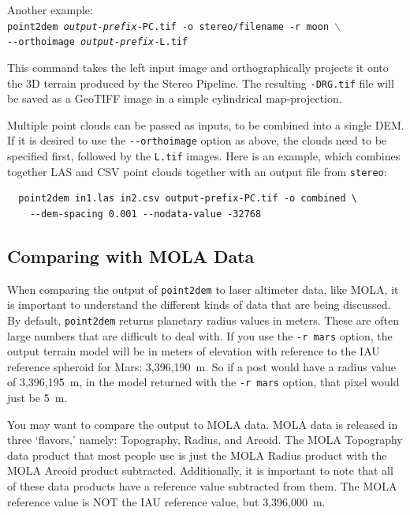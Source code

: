 Another example: \\
\hspace*{2em}\texttt{point2dem \textit{output-prefix}-PC.tif -o stereo/filename -r moon $\backslash$} \\
\hspace*{4em}\texttt{-\/-orthoimage \textit{output-prefix}-L.tif}

This command takes the left input image and orthographically projects
it onto the 3D terrain produced by the Stereo Pipeline.  The resulting
{\tt *-DRG.tif} file will be saved as a GeoTIFF image in a
simple cylindrical map-projection.

Multiple point clouds can be passed as inputs, to be combined into a
single \ac{DEM}. If it is desired to use the \texttt{-\/-orthoimage}
option as above, the clouds need to be specified first, followed by the
\texttt{L.tif} images. Here is an example, which combines together LAS
and CSV point clouds together with an output file from {\tt stereo}:
\begin{verbatim}
  point2dem in1.las in2.csv output-prefix-PC.tif -o combined \
    --dem-spacing 0.001 --nodata-value -32768
\end{verbatim}

\subsection{Comparing with MOLA Data}

When comparing the output of \texttt{point2dem} to laser altimeter
data, like MOLA, it is important to understand the different kinds
of data that are being discussed.  By default, \texttt{point2dem}
returns planetary radius values in meters.  These are often large
numbers that are difficult to deal with.  If you use the \texttt{-r
mars} option, the output terrain model will be in meters of elevation
with reference to the IAU reference spheroid for Mars: 3,396,190~m.
So if a post would have a radius value of 3,396,195~m, in the model
returned with the \texttt{-r mars} option, that pixel would just be 5~m.

You may want to compare the output to MOLA data.  MOLA data is
released in three `flavors,' namely: Topography, Radius, and Areoid.
The MOLA Topography data product that most people use is just the MOLA Radius
product with the MOLA Areoid product subtracted.  Additionally, it is
important to note that all of these data products have a reference
value subtracted from them.  The MOLA reference value is NOT the
IAU reference value, but 3,396,000~m.


